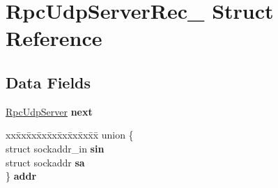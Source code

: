 \hypertarget{structRpcUdpServerRec__}{}\section{Rpc\+Udp\+Server\+Rec\+\_\+ Struct Reference}
\label{structRpcUdpServerRec__}
\subsection*{Data Fields}
\begin{DoxyCompactItemize}
\item 
\mbox{\label{structRpcUdpServerRec___a724eed545b1456e092e35401e638e59b}} 
\mbox{\hyperlink{structRpcUdpServerRec__}{Rpc\+Udp\+Server}} {\bfseries next}
\item 
\mbox{\label{structRpcUdpServerRec___acd65a77c3e48d95044204bac4cde3f8d}} 
\begin{tabbing}
xx\=xx\=xx\=xx\=xx\=xx\=xx\=xx\=xx\=\kill
union \{\\
\>struct sockaddr\_in {\bfseries sin}\\
\>struct sockaddr {\bfseries sa}\\
\} {\bfseries addr}\\


\end{tabbing}
\end{DoxyCompactItemize}
